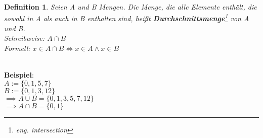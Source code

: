 \documentclass[12pt,german,a4]{article}
\begin{document}
\newtheorem{defIntersect}[defSet]{Definition}
\begin{defIntersect}
Seien A und B Mengen. Die Menge, die alle Elemente enthält, die sowohl in A als auch in B enthalten sind, heißt {\bf Durchschnittsmenge}\footnote{eng. intersection} von A und B.\\
Schreibweise: $A \cap B$\\
Formell: $x \in A \cap B \Leftrightarrow x \in A \wedge x \in B$\\
\end{defIntersect}

\\

{\bf Beispiel}: \\

$A := \{0, 1, 5, 7\}$\\
$B := \{0, 1, 3, 12\}$\\
$\implies A \cup B = \{0, 1, 3, 5, 7, 12\}$\\
$\implies A \cap B = \{0, 1\}$

\pagebreak
\end{document}
